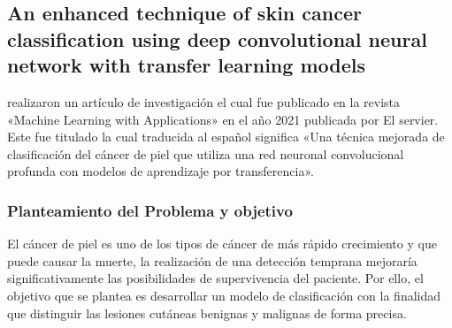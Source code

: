 

\subsection{An enhanced technique of skin cancer classification using deep convolutional neural network with transfer learning models \citep*{ali_2021enhanced}}
\citeauthor{ali_2021enhanced} realizaron un artículo de investigación el cual fue publicado en la revista «Machine Learning with Applications» en el año 2021 publicada por El servier. Este fue titulado  la cual traducida al español significa «Una técnica mejorada de clasificación del cáncer de piel que utiliza una red neuronal convolucional profunda con modelos de aprendizaje por transferencia».

\subsubsection{Planteamiento del Problema y objetivo}
El cáncer de piel es uno de los tipos de cáncer de más rápido crecimiento y que puede causar la muerte, la realización de una detección temprana mejoraría significativamente las posibilidades de supervivencia del paciente. Por ello, el objetivo que se plantea es desarrollar un modelo de clasificación con la finalidad que distinguir las lesiones cutáneas benignas y malignas de forma precisa.

